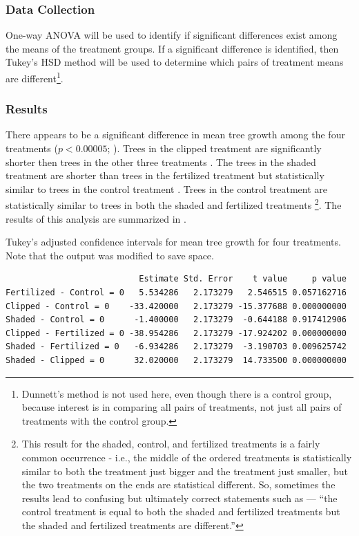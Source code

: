 \documentclass[10pt,openany]{book}\usepackage[]{graphicx}\usepackage[]{color}
\makeatletter
\newenvironment{kframe}{%
 \def\at@end@of@kframe{}%
 \ifinner\ifhmode%
  \def\at@end@of@kframe{\end{minipage}}%
  \begin{minipage}{\columnwidth}%
 \fi\fi%
 \def\FrameCommand##1{\hskip\@totalleftmargin \hskip-\fboxsep
 \colorbox{shadecolor}{##1}\hskip-\fboxsep
     \hskip-\linewidth \hskip-\@totalleftmargin \hskip\columnwidth}%
 \MakeFramed {\advance\hsize-\width
   \@totalleftmargin\z@ \linewidth\hsize
   \@setminipage}}%
 {\par\unskip\endMakeFramed%
 \at@end@of@kframe}
\newenvironment{knitrout}{}{} %
\makeatother
\begin{document}
\subsubsection*{Data Collection}
One-way ANOVA will be used to identify if significant differences exist among the means of the treatment groups.  If a significant difference is identified, then Tukey's HSD method will be used to determine which pairs of treatment means are different\footnote{Dunnett's method is not used here, even though there is a control group, because interest is in comparing all pairs of treatments, not just all pairs of treatments with the control group.}.

\subsubsection*{Results}
There appears to be a significant difference in mean tree growth among the four treatments ($p<0.00005$; ).  Trees in the clipped treatment are significantly shorter then trees in the other three treatments .  The trees in the shaded treatment are shorter than trees in the fertilized treatment but statistically similar to trees in the control treatment .  Trees in the control treatment are statistically similar to trees in both the shaded and fertilized treatments \footnote{This result for the shaded, control, and fertilized treatments is a fairly common occurrence - i.e., the middle of the ordered treatments is statistically similar to both the treatment just bigger and the treatment just smaller, but the two treatments on the ends are statistical different.  So, sometimes the results lead to confusing but ultimately correct statements such as --- ``the control treatment is equal to both the shaded and fertilized treatments but the shaded and fertilized treatments are different.''}.  The results of this analysis are summarized in .

\begin{table}[h]
  \centering
  \caption{Tukey's adjusted confidence intervals for mean tree growth for four treatments. Note that the output was modified to save space.}\label{tab:OWAEx2HSD}
\begin{knitrout}
\color{fgcolor}\begin{kframe}
\begin{verbatim}
                           Estimate Std. Error    t value     p value
Fertilized - Control = 0   5.534286   2.173279   2.546515 0.057162716
Clipped - Control = 0    -33.420000   2.173279 -15.377688 0.000000000
Shaded - Control = 0      -1.400000   2.173279  -0.644188 0.917412906
Clipped - Fertilized = 0 -38.954286   2.173279 -17.924202 0.000000000
Shaded - Fertilized = 0   -6.934286   2.173279  -3.190703 0.009625742
Shaded - Clipped = 0      32.020000   2.173279  14.733500 0.000000000
\end{verbatim}
\end{kframe}
\end{knitrout}
\end{table}
\end{document}
